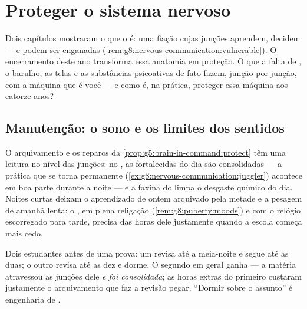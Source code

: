 \chapter{Proteger o sistema nervoso}\label{ch:g8:protecting-the-nervous-system}

Dois capítulos mostraram o que o  é: uma fiação cujas
junções aprendem, decidem --- e podem ser enganadas
(\cref{rem:g8:nervous-communication:vulnerable}). O encerramento deste
ano transforma essa anatomia em proteção. O que a falta de , o
barulho, as telas e as substâncias psicoativas de fato fazem, junção
por junção, com a máquina que é você --- e como é, na prática, proteger
essa máquina aos catorze anos?

\section{Manutenção: o sono e os limites dos sentidos}

\begin{proposition}\label{prop:g8:protecting-the-nervous-system:sleep}
O arquivamento e os reparos da
\cref{prop:g5:brain-in-command:protect} têm uma leitura no nível das
junções: no , as  fortalecidas do dia são consolidadas ---
a prática que se torna permanente
(\cref{ex:g8:nervous-communication:juggler}) acontece em boa parte
durante a noite --- e a faxina do  limpa o desgaste químico do
dia. Noites curtas deixam o aprendizado de ontem arquivado pela metade
e a pesagem de amanhã lenta: o  , em plena religação
(\cref{rem:g8:puberty:moods}) e com o relógio escorregado para tarde,
precisa das horas dele justamente quando a escola começa mais cedo.
\end{proposition}
\admitted

\begin{example}\label{ex:g8:protecting-the-nervous-system:revision}
Dois estudantes antes de uma prova: um revisa até a meia-noite e segue
até as duas; o outro revisa até as dez e dorme. O segundo em geral
ganha --- a matéria atravessou as junções dele \emph{e foi
consolidada}; as horas extras do primeiro custaram justamente o
arquivamento que faz a revisão pegar. ``Dormir sobre o assunto'' é
engenharia de .
\end{example}

